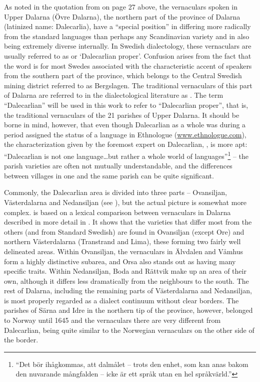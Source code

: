 As noted in the quotation from \citet{Wessén1966} on page 27 above, the vernaculars spoken in Upper Dalarna (Övre Dalarna), the northern part of the province of Dalarna (latinized name: Dalecarlia), have a “special position” in differing more radically from the standard languages than perhaps any Scandinavian variety and in also being extremely diverse internally. In Swedish dialectology, these vernaculars are usually referred to as  or ‘Dalecarlian proper’. Confusion arises from the fact that the word  is for most Swedes associated with the characteristic accent of speakers from the southern part of the province, which belongs to the Central Swedish mining district referred to as Bergslagen. The traditional vernaculars of this part of Dalarna are referred to in the dialectological literature as . The term “Dalecarlian” will be used in this work to refer to “Dalecarlian proper”, that is, the traditional vernaculars of the 21 parishes of Upper Dalarna. It should be borne in mind, however, that even though Dalecarlian as a whole was during a period  assigned the status of a language in Ethnologue (\href{http://www.ethnologue.com}{{www.ethnologue.com}}), the characterization given by the foremost expert on Dalecarlian, \citet[257]{Levander1928}, is more apt: “Dalecarlian is not one language…but rather a whole world of languages”\footnote{“Det bör ihågkommas, att dalmålet – trots den enhet, som kan anas bakom den nuvarande mångfalden – icke är ett språk utan en hel språkvärld.”} – the parish varieties are often not mutually understandable, and the differences between villages in one and the same parish can be quite significant. 

Commonly, the Dalecarlian area is divided into three parts – Ovansiljan, Västerdalarna and Nedansiljan (see ), but the actual picture is somewhat more complex.  is based on a lexical comparison between vernaculars in Dalarna described in more detail in \citet{Dahl2005}. It shows that the varieties that differ most from the others (and from Standard Swedish) are found in Ovansiljan (except Ore) and northern Västerdalarna (Transtrand and Lima), these forming two fairly well delineated areas. Within Ovansiljan, the vernaculars in Älvdalen and Våmhus form a highly distinctive subarea, and Orsa also stands out as having many specific traits. Within Nedansiljan, Boda and Rättvik make up an area of their own, although it differs less dramatically from the neighbours to the south. The rest of Dalarna, including the remaining parts of Västerdalarna and Nedansiljan, is most properly regarded as a dialect continuum without clear borders. The parishes of Särna and Idre in the northern tip of the province, however, belonged to Norway until 1645 and the vernaculars there are very different from Dalecarlian, being quite similar to the Norwegian vernaculars on the other side of the border. 

